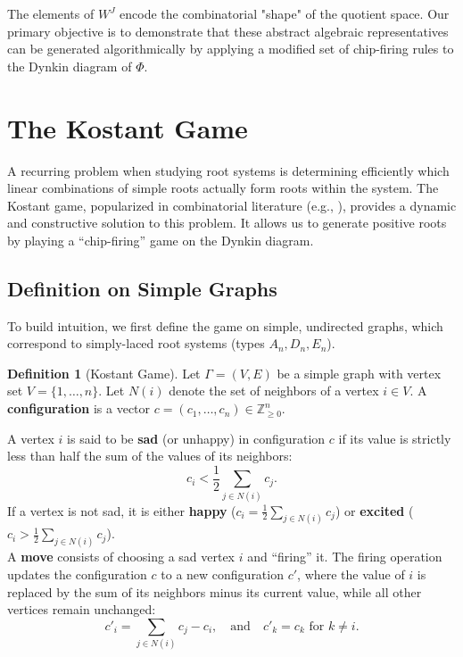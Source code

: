 \documentclass[11pt,a4paper]{amsart}
\newcommand{\Z}{\mathbb{Z}}
\theoremstyle{plain}
\theoremstyle{definition}
\newtheorem{definition}[theorem]{Definition}
\theoremstyle{remark}
\begin{document}
The elements of $W^J$ encode the combinatorial "shape" of the quotient space. Our primary objective is to demonstrate that these abstract algebraic representatives can be generated algorithmically by applying a modified set of chip-firing rules to the Dynkin diagram of $\Phi$.


\section{The Kostant Game}
\label{sec:kostant_game}

A recurring problem when studying root systems is determining efficiently which linear combinations of simple roots actually form roots within the system. The Kostant game, popularized in combinatorial literature (e.g., \cite{chen2017}), provides a dynamic and constructive solution to this problem. It allows us to generate positive roots by playing a ``chip-firing'' game on the Dynkin diagram.


\subsection{Definition on Simple Graphs}

To build intuition, we first define the game on simple, undirected graphs, which correspond to simply-laced root systems (types $A_n, D_n, E_n$).

\begin{definition}[Kostant Game]
	\label{def:kostant_game}
	Let $\Gamma = (V, E)$ be a simple graph with vertex set $V = \{1, \dots, n\}$. Let $N(i)$ denote the set of neighbors of a vertex $i \in V$. A \textbf{configuration} is a vector $c = (c_1, \dots, c_n) \in \Z_{\ge 0}^n$. 
	
	A vertex $i$ is said to be \textbf{sad} (or unhappy) in configuration $c$ if its value is strictly less than half the sum of the values of its neighbors:
	\begin{equation}
		c_i < \frac{1}{2} \sum_{j \in N(i)} c_j.
	\end{equation}
    If a vertex is not sad, it is either \textbf{happy} ($c_i = \frac{1}{2} \sum_{j \in N(i)} c_j$) or \textbf{excited} ($c_i > \frac{1}{2} \sum_{j \in N(i)} c_j$).\\
	
	A \textbf{move} consists of choosing a sad vertex $i$ and ``firing'' it. The firing operation updates the configuration $c$ to a new configuration $c'$, where the value of $i$ is replaced by the sum of its neighbors minus its current value, while all other vertices remain unchanged:
	\begin{equation}
		c'_i = \sum_{j \in N(i)} c_j - c_i, \quad \text{and} \quad c'_k = c_k \text{ for } k \neq i.
	\end{equation}
\end{definition}
\end{document}
